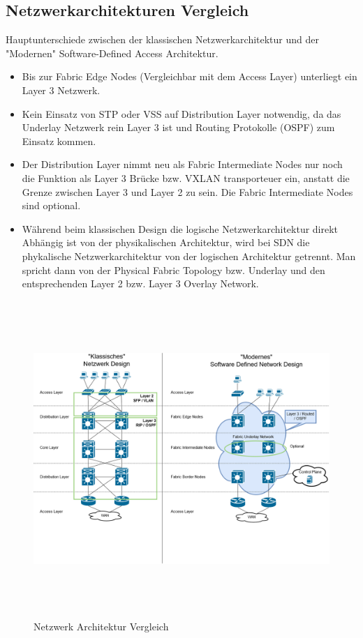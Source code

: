 \subsection{Netzwerkarchitekturen Vergleich}
Hauptunterschiede zwischen der klassischen Netzwerkarchitektur und der "Modernen" Software-Defined Access Architektur. 

\begin{itemize}
	\item Bis zur Fabric Edge Nodes (Vergleichbar mit dem Access Layer) unterliegt ein Layer 3 Netzwerk. 
	\item Kein Einsatz von STP oder VSS auf Distribution Layer notwendig, da das Underlay Netzwerk rein Layer 3 ist und Routing Protokolle (OSPF) zum Einsatz kommen.
	\item Der Distribution Layer nimmt neu als Fabric Intermediate Nodes nur noch die Funktion als Layer 3 Brücke bzw. VXLAN transporteuer ein, anstatt die Grenze zwischen Layer 3 und Layer 2 zu sein. Die Fabric Intermediate Nodes sind optional. 
	\item Während beim klassischen Design die logische Netzwerkarchitektur direkt Abhängig ist von der physikalischen Architektur, wird bei SDN die phykalische Netzwerkarchitektur von der logischen Architektur getrennt. Man spricht dann von der Physical Fabric Topology bzw. Underlay und den entsprechenden Layer 2 bzw. Layer 3 Overlay Network. 
\end{itemize}

\begin{figure}[H]
	\centering
	\includegraphics[height=12cm]{img/LabNetworkArchitecture_Vergleich.png}
	\caption{Netzwerk Architektur Vergleich}
	\label{fig:LabNetworkArchitectureVergleich}
\end{figure}


